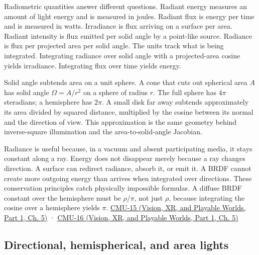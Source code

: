 \hypertarget{03-visual-computing-i-ch004-measure-units-and-conservation}{}

Radiometric quantities answer different questions. Radiant energy measures an amount of light energy and is measured in joules. Radiant flux is energy per time and is measured in watts. Irradiance is flux arriving on a surface per area. Radiant intensity is flux emitted per solid angle by a point-like source. Radiance is flux per projected area per solid angle. The units track what is being integrated. Integrating radiance over solid angle with a projected-area cosine yields irradiance. Integrating flux over time yields energy.

Solid angle subtends area on a unit sphere. A cone that cuts out spherical area \(A\) has solid angle \(\Omega=A/r^2\) on a sphere of radius \(r\). The full sphere has \(4\pi\) steradians; a hemisphere has \(2\pi\). A small disk far away subtends approximately its area divided by squared distance, multiplied by the cosine between its normal and the direction of view. This approximation is the same geometry behind inverse-square illumination and the area-to-solid-angle Jacobian.

Radiance is useful because, in a vacuum and absent participating media, it stays constant along a ray. Energy does not disappear merely because a ray changes direction. A surface can redirect radiance, absorb it, or emit it. A BRDF cannot create more outgoing energy than arrives when integrated over directions. These conservation principles catch physically impossible formulas. A diffuse BRDF constant over the hemisphere must be \(\rho/\pi\), not just \(\rho\), because integrating the cosine over a hemisphere yields \(\pi\). \href{../07-Vision-XR-and-Playable-Worlds-P01/main.pdf\#nameddest=04-visual-computing-ii-ch036-cmu-15---radiometry}{CMU-15 (Vision, XR, and Playable Worlds, Part 1, Ch. 5)} · \href{../07-Vision-XR-and-Playable-Worlds-P01/main.pdf\#nameddest=04-visual-computing-ii-ch036-cmu-16---the-rendering-equation}{CMU-16 (Vision, XR, and Playable Worlds, Part 1, Ch. 5)}

\subsection{Directional, hemispherical, and area lights}\label{03-visual-computing-i-ch004-directional-hemispherical-and-area-lights}

\hypertarget{03-visual-computing-i-ch004-directional-hemispherical-and-area-lights}{}

